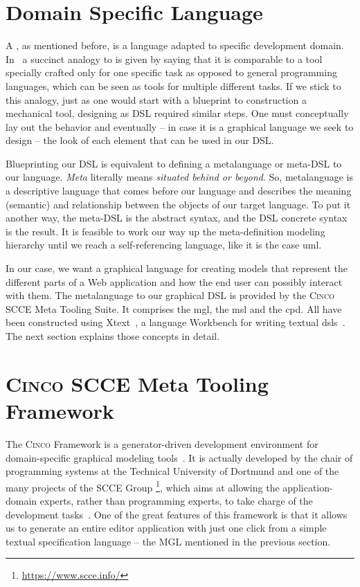 \section{Domain Specific Language}\label{sec:DSL}

A , as mentioned before, is a language adapted to specific development domain. In~\cite{Naujokat2018} a succinct analogy to  is given by saying that it is comparable to a tool specially crafted only for one specific task as opposed to general programming languages, which can be seen as tools for multiple different tasks. If we stick to this analogy, just as one would start with a blueprint to construction a mechanical tool, designing as DSL required similar steps. One must conceptually lay out the behavior and eventually -- in case it is a graphical language we seek to design -- the look of each element that can be used in our DSL.

Blueprinting our DSL is equivalent to defining a metalanguage or meta-DSL to our language. \textit{Meta} literally means \textit{situated behind or beyond}\cite{merriam}. So, metalanguage is a descriptive language that comes before our language and describes the meaning (semantic) and relationship between the objects of our target language. To put it another way, the meta-DSL is the abstract syntax, and the DSL concrete syntax is the result. It is feasible to work our way up the meta-definition modeling hierarchy until we reach a self-referencing language, like it is the case \gls{uml}.

In our case, we want a graphical language for creating models that represent the different parts of a Web application and how the end user can possibly interact with them. The metalanguage to our graphical DSL is provided by the \textsc{Cinco} SCCE Meta Tooling Suite. It comprises the \gls{mgl}, the \gls{msl} and the \gls{cpd}. All have been constructed using Xtext~\cite{bettini2016implementing}, a language Workbench for writing textual \glspl*{dsl}~\cite{naujokat-diss}. The next section explains those concepts in detail.

\section{\textsc{Cinco SCCE} Meta Tooling Framework}\label{sec:cincoFW}


The \textsc{Cinco} Framework is a generator-driven development environment for domain-specific graphical modeling tools~\cite{Cinco}. It is actually developed by the chair of programming systems at the Technical University of Dortmund and one of the many projects of the SCCE Group \footnote[1]{\url{https://www.scce.info/}}, which aims at allowing the application-domain experts, rather than programming experts, to take charge of the development tasks~\cite{scce}. One of the great features of this framework is that it allows us to generate an entire editor application with just one click from a simple textual specification language -- the MGL mentioned in the previous section. 

